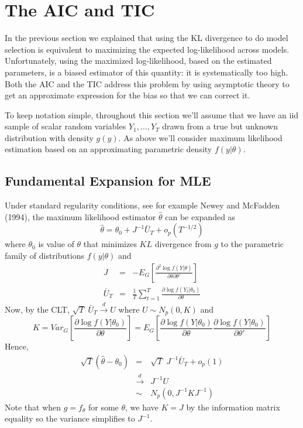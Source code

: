 \documentclass[12pt]{article}
\theoremstyle{definition}
\begin{document}
\section{The AIC and TIC}
In the previous section we explained that using the KL divergence to do model selection is equivalent to maximizing the expected log-likelihood across models. Unfortunately, using the maximized log-likelihood, based on the estimated parameters, is a biased estimator of this quantity: it is systematically too high. Both the AIC and the TIC address this problem by using asymptotic theory to get an approximate expression for the bias so that we can correct it.

To keep notation simple, throughout this section we'll assume that we have an iid sample of scalar random variables $Y_1, \hdots, Y_T$ drawn from a true but unknown distribution with density $g(y)$. As above we'll consider maximum likelihood estimation based on an approximating parametric density $f(y|\theta)$.

\subsection{Fundamental Expansion for MLE}
Under standard regularity conditions, see for example Newey and McFadden (1994), the maximum likelihood estimator $\widehat{\theta}$ can be expanded as
	$$\widehat{\theta} = \theta_0 + J^{-1} \bar{U}_T + o_p(T^{-1/2})$$
where $\theta_0$ is value of $\theta$ that minimizes $KL$ divergence from $g$ to the parametric family of distributions $f(y|\theta)$ and
	\begin{eqnarray*}
		J &=& -E_G \left[ \frac{\partial^2 \log f(Y|\theta)}{\partial \theta \partial \theta'}\right]\\
		\bar{U}_T &=& \frac{1}{T} \sum_{t=1}^T \frac{\partial \log f(Y_t|\theta_0)}{\partial\theta}
	\end{eqnarray*}
Now, by the CLT, $\sqrt{T}\; \bar{U}_T \overset{d}{\rightarrow} U$ where $U\sim N_p(0, K)$ and
	$$K = Var_G \left[ \frac{\partial \log f(Y|\theta_0)}{\partial\theta}\right] = E_G\left[ \frac{\partial \log f(Y|\theta_0)}{\partial\theta} \frac{\partial \log f(Y|\theta_0)}{\partial\theta'}\right]$$
Hence,
	\begin{eqnarray*}
		\sqrt{T}\left(\widehat{\theta} - \theta_0 \right) &=& \sqrt{T} \; J^{-1} \bar{U}_T + o_p(1) \\
		&\overset{d}{\rightarrow}& J^{-1} U\\
		 &\sim& N_p(0, J^{-1}KJ^{-1})
	\end{eqnarray*}
Note that when $g = f_\theta$ for some $\theta$, we have $K = J$ by the information matrix equality so the variance simplifies to $J^{-1}$.
\end{document}
